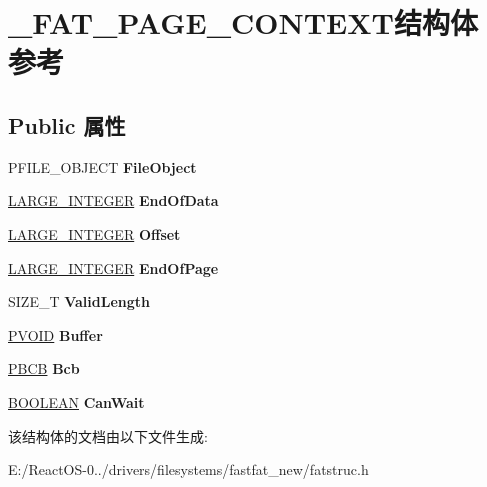 \hypertarget{struct___f_a_t___p_a_g_e___c_o_n_t_e_x_t}{}\section{\+\_\+\+F\+A\+T\+\_\+\+P\+A\+G\+E\+\_\+\+C\+O\+N\+T\+E\+X\+T结构体 参考}
\label{struct___f_a_t___p_a_g_e___c_o_n_t_e_x_t}
\subsection*{Public 属性}
\begin{DoxyCompactItemize}
\item 
\mbox{\label{struct___f_a_t___p_a_g_e___c_o_n_t_e_x_t_a55537041f544724bd6114dd79821c34a}} 
P\+F\+I\+L\+E\+\_\+\+O\+B\+J\+E\+CT {\bfseries File\+Object}
\item 
\mbox{\label{struct___f_a_t___p_a_g_e___c_o_n_t_e_x_t_a135ae6d6a2566640018d5a1d7266cf52}} 
\hyperlink{union___l_a_r_g_e___i_n_t_e_g_e_r}{L\+A\+R\+G\+E\+\_\+\+I\+N\+T\+E\+G\+ER} {\bfseries End\+Of\+Data}
\item 
\mbox{\label{struct___f_a_t___p_a_g_e___c_o_n_t_e_x_t_a1100c5196fbcab27db8db8db0bade8fe}} 
\hyperlink{union___l_a_r_g_e___i_n_t_e_g_e_r}{L\+A\+R\+G\+E\+\_\+\+I\+N\+T\+E\+G\+ER} {\bfseries Offset}
\item 
\mbox{\label{struct___f_a_t___p_a_g_e___c_o_n_t_e_x_t_ae97a328973841360b254f7595a433480}} 
\hyperlink{union___l_a_r_g_e___i_n_t_e_g_e_r}{L\+A\+R\+G\+E\+\_\+\+I\+N\+T\+E\+G\+ER} {\bfseries End\+Of\+Page}
\item 
\mbox{\label{struct___f_a_t___p_a_g_e___c_o_n_t_e_x_t_a8cf7749c8fe2cc1fddf514889e1d0e01}} 
S\+I\+Z\+E\+\_\+T {\bfseries Valid\+Length}
\item 
\mbox{\label{struct___f_a_t___p_a_g_e___c_o_n_t_e_x_t_aeff4e0ce5d4ad631e1b7d5b53b7ca0df}} 
\hyperlink{interfacevoid}{P\+V\+O\+ID} {\bfseries Buffer}
\item 
\mbox{\label{struct___f_a_t___p_a_g_e___c_o_n_t_e_x_t_ae0e3ffeb90a0dc58b4ac07dde3e31c3c}} 
\hyperlink{interfacevoid}{P\+B\+CB} {\bfseries Bcb}
\item 
\mbox{\label{struct___f_a_t___p_a_g_e___c_o_n_t_e_x_t_a80f023c75f150f19bacd95e49ecd0a39}} 
\hyperlink{_processor_bind_8h_a112e3146cb38b6ee95e64d85842e380a}{B\+O\+O\+L\+E\+AN} {\bfseries Can\+Wait}
\end{DoxyCompactItemize}


该结构体的文档由以下文件生成\+:\begin{DoxyCompactItemize}
\item 
E\+:/\+React\+O\+S-\/0../drivers/filesystems/fastfat\+\_\+new/fatstruc.\+h\end{DoxyCompactItemize}
